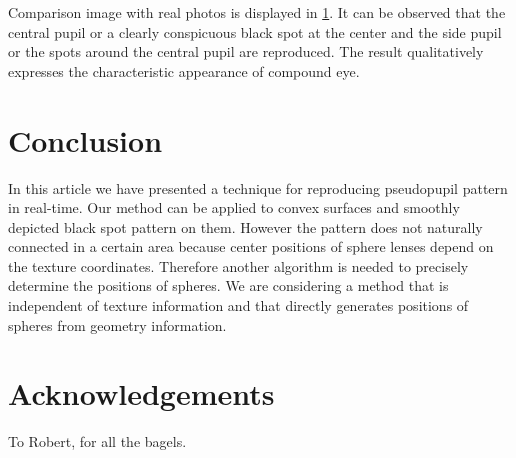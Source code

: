 Comparison image with real photos is displayed in \ref{}.
It can be observed that the central pupil or a clearly conspicuous black spot at the center and the side pupil or the spots around the central pupil are reproduced.
The result qualitatively expresses the characteristic appearance of compound eye.

\section{Conclusion}

In this article we have presented a technique for reproducing pseudopupil pattern in real-time.
Our method can be applied to convex surfaces and smoothly depicted black spot pattern on them.
However the pattern does not naturally connected in a certain area because center positions of sphere lenses depend on the texture coordinates.
Therefore another algorithm is needed to precisely determine the positions of spheres.
We are considering a method that is independent of texture information and that directly generates positions of spheres from geometry information.


\section*{Acknowledgements}

To Robert, for all the bagels.
